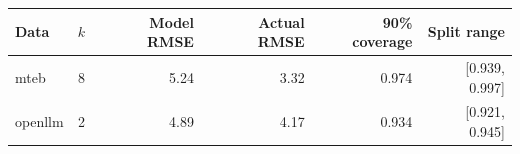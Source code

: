 \begin{tabular}{lrrrrr}
\toprule
Data & $k$ & Model RMSE & Actual RMSE & 90\% coverage & Split range \\
\midrule
mteb & 8 & 5.24 & 3.32 & 0.974 & [0.939, 0.997] \\
openllm & 2 & 4.89 & 4.17 & 0.934 & [0.921, 0.945] \\
\bottomrule
\end{tabular}

